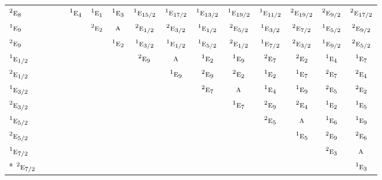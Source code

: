 \documentclass[10pt,a4paper]{article}
\numberwithin{equation}{section}
\newcommand{\irr}[1]{\text{\normalfont\scshape #1}}
\newcommand{\conjpair}[1]{{}^{#1}}
\begin{document}
{\begin{longtable}{@{}lcccccccccccccc@{}}
$\conjpair{2}\irr{e}_{8}$ &  &  &  & $\conjpair{1}\irr{e}_{4}$ & $\conjpair{1}\irr{e}_{1}$ & $\conjpair{1}\irr{e}_{3}$ & $\conjpair{1}\irr{e}_{15/2}$ & $\conjpair{1}\irr{e}_{17/2}$ & $\conjpair{1}\irr{e}_{13/2}$ & $\conjpair{1}\irr{e}_{19/2}$ & $\conjpair{1}\irr{e}_{11/2}$ & $\conjpair{2}\irr{e}_{19/2}$ & $\conjpair{2}\irr{e}_{9/2}$ & $\conjpair{2}\irr{e}_{17/2}$\\
$\conjpair{1}\irr{e}_{9}$ &  &  &  &  & $\conjpair{2}\irr{e}_{2}$ & $\irr{a}$ & $\conjpair{2}\irr{e}_{1/2}$ & $\conjpair{2}\irr{e}_{3/2}$ & $\conjpair{1}\irr{e}_{1/2}$ & $\conjpair{2}\irr{e}_{5/2}$ & $\conjpair{1}\irr{e}_{3/2}$ & $\conjpair{2}\irr{e}_{7/2}$ & $\conjpair{1}\irr{e}_{5/2}$ & $\conjpair{2}\irr{e}_{9/2}$\\
$\conjpair{2}\irr{e}_{9}$ &  &  &  &  &  & $\conjpair{1}\irr{e}_{2}$ & $\conjpair{1}\irr{e}_{3/2}$ & $\conjpair{1}\irr{e}_{1/2}$ & $\conjpair{1}\irr{e}_{5/2}$ & $\conjpair{2}\irr{e}_{1/2}$ & $\conjpair{1}\irr{e}_{7/2}$ & $\conjpair{2}\irr{e}_{3/2}$ & $\conjpair{1}\irr{e}_{9/2}$ & $\conjpair{2}\irr{e}_{5/2}$\\
$\conjpair{1}\irr{e}_{1/2}$ &  &  &  &  &  &  & $\conjpair{2}\irr{e}_{9}$ & $\irr{a}$ & $\conjpair{1}\irr{e}_{2}$ & $\conjpair{1}\irr{e}_{9}$ & $\conjpair{2}\irr{e}_{7}$ & $\conjpair{2}\irr{e}_{2}$ & $\conjpair{1}\irr{e}_{4}$ & $\conjpair{1}\irr{e}_{7}$\\
$\conjpair{2}\irr{e}_{1/2}$ &  &  &  &  &  &  &  & $\conjpair{1}\irr{e}_{9}$ & $\conjpair{2}\irr{e}_{9}$ & $\conjpair{2}\irr{e}_{2}$ & $\conjpair{1}\irr{e}_{2}$ & $\conjpair{1}\irr{e}_{7}$ & $\conjpair{2}\irr{e}_{7}$ & $\conjpair{2}\irr{e}_{4}$\\
$\conjpair{1}\irr{e}_{3/2}$ &  &  &  &  &  &  &  &  & $\conjpair{2}\irr{e}_{7}$ & $\irr{a}$ & $\conjpair{1}\irr{e}_{4}$ & $\conjpair{1}\irr{e}_{9}$ & $\conjpair{2}\irr{e}_{5}$ & $\conjpair{2}\irr{e}_{2}$\\
$\conjpair{2}\irr{e}_{3/2}$ &  &  &  &  &  &  &  &  &  & $\conjpair{1}\irr{e}_{7}$ & $\conjpair{2}\irr{e}_{9}$ & $\conjpair{2}\irr{e}_{4}$ & $\conjpair{1}\irr{e}_{2}$ & $\conjpair{1}\irr{e}_{5}$\\
$\conjpair{1}\irr{e}_{5/2}$ &  &  &  &  &  &  &  &  &  &  & $\conjpair{2}\irr{e}_{5}$ & $\irr{a}$ & $\conjpair{1}\irr{e}_{6}$ & $\conjpair{1}\irr{e}_{9}$\\
$\conjpair{2}\irr{e}_{5/2}$ &  &  &  &  &  &  &  &  &  &  &  & $\conjpair{1}\irr{e}_{5}$ & $\conjpair{2}\irr{e}_{9}$ & $\conjpair{2}\irr{e}_{6}$\\
$\conjpair{1}\irr{e}_{7/2}$ &  &  &  &  &  &  &  &  &  &  &  &  & $\conjpair{2}\irr{e}_{3}$ & $\irr{a}$\\*
$\conjpair{2}\irr{e}_{7/2}$ &  &  &  &  &  &  &  &  &  &  &  &  &  & $\conjpair{1}\irr{e}_{3}$\\
\bottomrule\end{longtable}}
\end{document}
